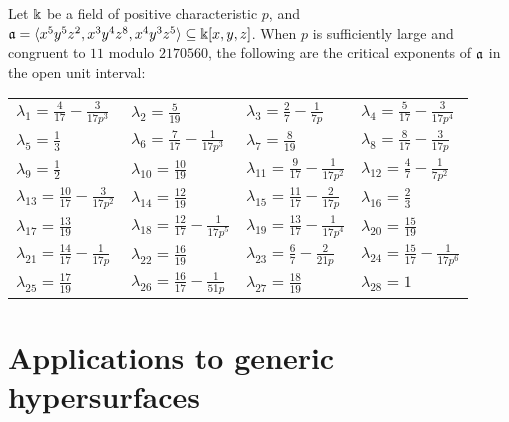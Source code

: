 \documentclass{amsart}
\begin{document}
\begin{example}
   Let $\Bbbk$ be a field of positive characteristic $p$, and $\mathfrak{a} = \langle x^5 y^5 z^2, x^3 y^4 z^8, x^4 y^3 z^5 \rangle \subseteq \Bbbk[x,y,z]$.
   When $p$ is sufficiently large and congruent to $11$ modulo $\num{2170560}$, the following are the critical exponents of $\mathfrak{a}$ in the open unit interval:
   \begin{center}
      \begingroup
      \setlength{\tabcolsep}{8pt} %
      \renewcommand{\arraystretch}{1.4} %
      \begin{tabular}{llll}
        $\lambda_1 = \frac{4}{17} - \frac{3}{17 p^3}$
        & $\lambda_2 = \frac5{19}$
        & $\lambda_3 = \frac27 - \frac1{7 p}$
        & $\lambda_4 = \frac5{17} - \frac3{17 p^4}$ \\
        $\lambda_5 = \frac13$ 
        & $\lambda_6 = \frac7{17} - \frac1{17 p^3}$
        & $\lambda_7 = \frac8{19}$
        & $\lambda_8 = \frac8{17} - \frac3{17 p}$ \\
        $\lambda_9 = \frac12$
        & $\lambda_{10} = \frac{10}{19}$
        & $\lambda_{11} = \frac9{17} - \frac1{17 p^2}$
        & $\lambda_{12} = \frac47 - \frac1{7 p^2}$ \\
        $\lambda_{13} = \frac{10}{17} - \frac3{17 p^2}$
        & $\lambda_{14} = \frac{12}{19}$
        & $\lambda_{15} = \frac{11}{17} - \frac2{17 p}$ 
        & $\lambda_{16} = \frac23$ \\
        $\lambda_{17} = \frac{13}{19}$
        & $\lambda_{18} = \frac{12}{17} - \frac1{17 p^5}$
        & $\lambda_{19} = \frac{13}{17} - \frac1{17 p^4}$
        & $\lambda_{20} = \frac{15}{19}$ \\
        $\lambda_{21} = \frac{14}{17} - \frac1{17 p}$
        & $\lambda_{22} = \frac{16}{19}$
        & $\lambda_{23} = \frac67 - \frac2{21 p}$
        & $\lambda_{24} = \frac{15}{17} - \frac1{17 p^6}$ \\
        $\lambda_{25} = \frac{17}{19}$
        & $\lambda_{26} = \frac{16}{17} - \frac1{51 p}$
        & $\lambda_{27} = \frac{18}{19}$
        & $\lambda_{28} = 1$ 
      \end{tabular}
   \endgroup
   \end{center}
\end{example}


\section{Applications to generic hypersurfaces}
\label{generic-hypersurfaces: S}
\end{document}
